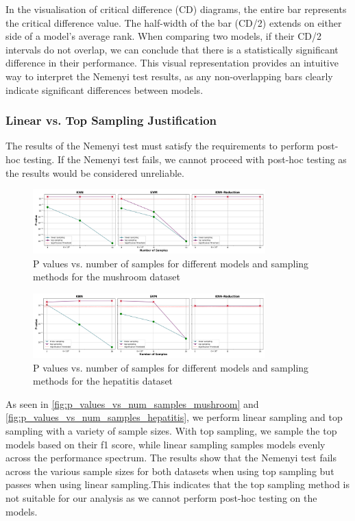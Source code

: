 In the visualisation of critical difference (CD) diagrams, the entire bar represents the critical difference value.
The half-width of the bar (CD/2) extends on either side of a model's average rank. When comparing two models,
if their CD/2 intervals do not overlap, we can conclude that there is a statistically significant difference in their performance.
This visual representation provides an intuitive way to interpret the Nemenyi test results, as any
non-overlapping bars clearly indicate significant differences between models.

\subsubsection{Linear vs. Top Sampling Justification}
The results of the Nemenyi test must satisfy the requirements to perform post-hoc testing.
If the Nemenyi test fails, we cannot proceed with post-hoc testing as the results would be considered unreliable.

\begin{figure}[!ht]
    \centering
    \includegraphics[width=0.8\textwidth]{figures/p_values_vs_num_samples_mushroom.png}
    \caption{P values vs. number of samples for different models and sampling methods for the mushroom dataset}
\label{fig:p_values_vs_num_samples_mushroom}
\end{figure}

\begin{figure}[!ht]
    \centering
    \includegraphics[width=0.8\textwidth]{figures/p_values_vs_num_samples_hepatitis.png}
    \caption{P values vs. number of samples for different models and sampling methods for the hepatitis dataset}
\label{fig:p_values_vs_num_samples_hepatitis}
\end{figure}

As seen in \autoref{fig:p_values_vs_num_samples_mushroom} and \autoref{fig:p_values_vs_num_samples_hepatitis}, we perform linear sampling and top sampling with a variety
of sample sizes. With top sampling, we sample the top models based on their f1 score, while linear sampling samples models
evenly across the performance spectrum. The results show that the Nemenyi test fails across the various sample sizes for both datasets
when using top sampling but passes when using linear sampling.This indicates that the top sampling method is not suitable for our analysis
as we cannot perform post-hoc testing on the models.

